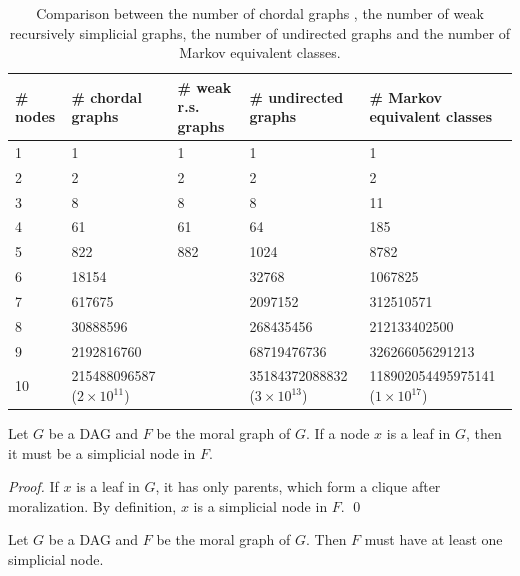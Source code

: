 \begin{table}[]
\centering
\caption{Comparison between the number of chordal graphs , the number of weak recursively simplicial graphs, the number of undirected graphs and the number of Markov equivalent classes.}
\label{my-label}
\begin{tabular}{lllll}
\# nodes & \# chordal graphs & \# weak r.s. graphs & \# undirected graphs & \# Markov equivalent classes \\ \hline
1        & 1                 & 1          & 1         & 1 \\
2        & 2                 & 2          & 2         & 2 \\
3        & 8                 & 8          & 8         & 11 \\
4        & 61                & 61         & 64         & 185 \\
5        & 822               & 882        & 1024            & 8782\\
6        & 18154             &       & 32768              & 1067825\\
7        & 617675            &            & 2097152         & 312510571\\
8        & 30888596          &            &  268435456        & 212133402500 \\
9        & 2192816760        &            &  68719476736       & 326266056291213 \\ 
10       & 215488096587 ($2\times 10^{11}$)     &            &  35184372088832 ($3\times 10^{13}$)       & 118902054495975141 ($1\times 10^{17}$) \\ \hline
\end{tabular}
\end{table}

\begin{proposition}
\label{prop:leaf_is_sim}
Let $G$ be a DAG and $F$ be the moral graph of $G$. If a node $x$ is a leaf in $G$, then it must be a simplicial node in $F$. 
\end{proposition}
\begin{proof}
If $x$ is a leaf in $G$, it has only parents, which form a clique after moralization. By definition, $x$ is a simplicial node in $F$. \qed
\end{proof}

\begin{corollary}
Let $G$ be a DAG and $F$ be the moral graph of $G$. Then $F$ must have at least one simplicial node. 
\end{corollary}

